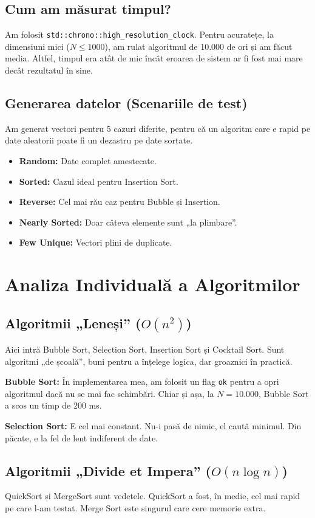 \documentclass[12pt, a4paper]{article}
\begin{document}
\subsection{Cum am măsurat timpul?}
Am folosit \texttt{std::chrono::high\_resolution\_clock}. Pentru acuratețe, la dimensiuni mici ($N \le 1000$), am rulat algoritmul de 10.000 de ori și am făcut media. Altfel, timpul era atât de mic încât eroarea de sistem ar fi fost mai mare decât rezultatul în sine.

\subsection{Generarea datelor (Scenariile de test)}
Am generat vectori pentru 5 cazuri diferite, pentru că un algoritm care e rapid pe date aleatorii poate fi un dezastru pe date sortate.
\begin{itemize}
    \item \textbf{Random:} Date complet amestecate.
    \item \textbf{Sorted:} Cazul ideal pentru Insertion Sort.
    \item \textbf{Reverse:} Cel mai rău caz pentru Bubble și Insertion.
    \item \textbf{Nearly Sorted:} Doar câteva elemente sunt „la plimbare”.
    \item \textbf{Few Unique:} Vectori plini de duplicate.
\end{itemize}

\section{Analiza Individuală a Algoritmilor}

\subsection{Algoritmii „Leneși” ($O(n^2)$)}
Aici intră Bubble Sort, Selection Sort, Insertion Sort și Cocktail Sort. Sunt algoritmi „de școală”, buni pentru a înțelege logica, dar groaznici în practică.

\textbf{Bubble Sort:} În implementarea mea, am folosit un flag \texttt{ok} pentru a opri algoritmul dacă nu se mai fac schimbări. Chiar și așa, la $N=10.000$, Bubble Sort a scos un timp de 200 ms. 

\textbf{Selection Sort:} E cel mai constant. Nu-i pasă de nimic, el caută minimul. Din păcate, e la fel de lent indiferent de date.

\subsection{Algoritmii „Divide et Impera” ($O(n \log n)$)}
QuickSort și MergeSort sunt vedetele. QuickSort a fost, în medie, cel mai rapid pe care l-am testat. Merge Sort este singurul care cere memorie extra.
\end{document}
